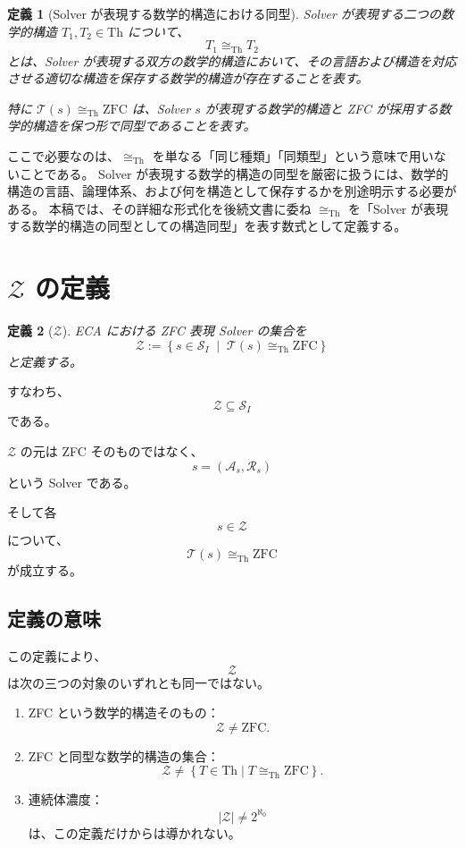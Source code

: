 \documentclass[a4paper,11pt]{article}
\newtheorem{definition}{定義}[section]
\newcommand{\Solver}{\mathcal{S}}
\newcommand{\Th}{\mathrm{Th}}
\begin{document}
\begin{definition}[Solver が表現する数学的構造における同型]
Solver が表現する二つの数学的構造 $T_1,T_2\in\Th$ について、
\[
T_1\cong_{\mathrm{Th}}T_2
\]
とは、Solver が表現する双方の数学的構造において、その言語および構造を対応させる適切な構造を保存する数学的構造が存在することを表す。

特に $\mathcal{T}(s)\cong_{\mathrm{Th}}\mathrm{ZFC}$ は、Solver $s$ が表現する数学的構造と ZFC が採用する数学的構造を保つ形で同型であることを表す。
\end{definition}

ここで必要なのは、$\cong_{\mathrm{Th}}$ を単なる「同じ種類」「同類型」という意味で用いないことである。
Solver が表現する数学的構造の同型を厳密に扱うには、数学的構造の言語、論理体系、および何を構造として保存するかを別途明示する必要がある。
本稿では、その詳細な形式化を後続文書に委ね $\cong_{\mathrm{Th}}$ を「Solver が表現する数学的構造の同型としての構造同型」を表す数式として定義する。

\section{$\mathcal{Z}$ の定義}

\begin{definition}[$\mathcal{Z}$]
ECA における ZFC 表現 Solver の集合を
\[
\boxed{
\mathcal{Z}
:=
\left\{
s\in\Solver_I
\;\middle|\;
\mathcal{T}(s)\cong_{\mathrm{Th}}\mathrm{ZFC}
\right\}
}
\]
と定義する。
\end{definition}

すなわち、
\[
\boxed{
\mathcal{Z}\subseteq\Solver_I
}
\]
である。

$\mathcal{Z}$ の元は ZFC そのものではなく、
\[
s=(\mathcal{A}_s,\mathcal{R}_s)
\]
という Solver である。

そして各
\[
s\in\mathcal{Z}
\]
について、
\[
\mathcal{T}(s)\cong_{\mathrm{Th}}\mathrm{ZFC}
\]
が成立する。

\subsection{定義の意味}

この定義により、
\[
\mathcal{Z}
\]
は次の三つの対象のいずれとも同一ではない。

\begin{enumerate}
\item ZFC という数学的構造そのもの：
\[
\mathcal{Z}\neq\mathrm{ZFC}.
\]

\item ZFC と同型な数学的構造の集合：
\[
\mathcal{Z}
\neq
\left\{
T\in\Th\mid T\cong_{\mathrm{Th}}\mathrm{ZFC}
\right\}.
\]

\item 連続体濃度：
\[
|\mathcal{Z}|
\neq
2^{\aleph_0}
\]
は、この定義だけからは導かれない。
\end{enumerate}
\end{document}
